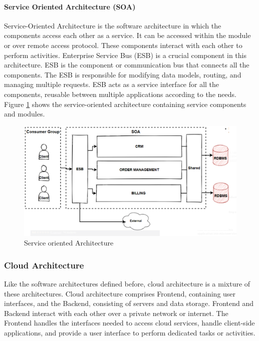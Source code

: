 \documentclass[12pt,a4paper]{article}
\begin{document}
\paragraph{Service Oriented Architecture (SOA)}

Service-Oriented Architecture is the software architecture in which the components access each other as a service. It can be accessed within the module or over remote access protocol. These components interact with each other to perform activities. Enterprise Service Bus (ESB) is a crucial component in this architecture. ESB is the component or communication bus that connects all the components. The ESB is responsible for modifying data models, routing, and managing multiple requests. ESB acts as a service interface for all the components, reusable between multiple applications according to the needs. Figure \ref{soa} shows the service-oriented architecture containing service components and modules. \cite{r19}

\begin{figure}[H]
\centering
\includegraphics[scale=0.5]{soa.PNG}
\caption{Service oriented Architecture \cite{r19}}
\label{soa}
\end{figure}

\subsubsection{Cloud Architecture}

Like the software architectures defined before, cloud architecture is a mixture of these architectures. Cloud architecture comprises Frontend, containing user interfaces, and the Backend, consisting of servers and data storage. Frontend and Backend interact with each other over a private network or internet. The Frontend handles the interfaces needed to access cloud services, handle client-side applications, and provide a user interface to perform dedicated tasks or activities. \cite{r20} 
\end{document}
